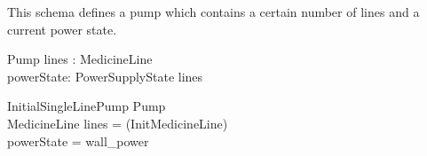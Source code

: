 \documentclass{article}
\begin{document}




This schema defines a pump which contains a certain number
of lines and a current power state.
\begin{schema}{Pump}
  lines : \seq MedicineLine \\
  powerState: PowerSupplyState
\where
  lines \neq \emptyset
\end{schema}


\begin{schema}{InitialSingleLinePump}
  Pump \\
  MedicineLine
\where
  lines = \langle (\theta InitMedicineLine) \rangle \\
  powerState = wall\_power \\
\end{schema}



\end{document}
